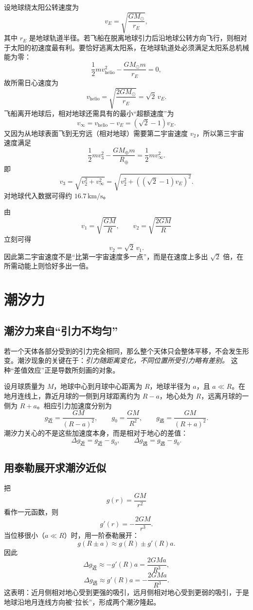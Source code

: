 设地球绕太阳公转速度为
\[
v_E=\sqrt{\frac{GM_\odot}{r_E}},
\]
其中 $r_E$ 是地球轨道半径。若飞船在脱离地球引力后沿地球公转方向飞行，则相对于太阳的初速度最有利。要恰好逃离太阳系，在地球轨道处必须满足太阳系总机械能为零：
\[
\frac12 m v_{\text{helio}}^2-\frac{GM_\odot m}{r_E}=0,
\]
故所需日心速度为
\[
v_{\text{helio}}=\sqrt{\frac{2GM_\odot}{r_E}}=\sqrt{2}\,v_E.
\]
飞船离开地球后，相对地球还需具有的最小“超额速度”为
\[
v_\infty=v_{\text{helio}}-v_E=(\sqrt{2}-1)v_E.
\]
又因为从地球表面飞到无穷远（相对地球）需要第二宇宙速度 $v_2$，所以第三宇宙速度满足
\[
\frac12 mv_3^2-\frac{GM_\oplus m}{R_\oplus}=\frac12 m v_\infty^2.
\]
即
\[
v_3=\sqrt{v_2^2+v_\infty^2}=\sqrt{v_2^2+\left((\sqrt2-1)v_E\right)^2}.
\]
对地球代入数据可得约 $16.7\,\text{km/s}$。

\begin{remark}
由
\[
v_1=\sqrt{\frac{GM}{R}},\qquad v_2=\sqrt{\frac{2GM}{R}}
\]
立刻可得
\[
v_2=\sqrt2\,v_1.
\]
因此第二宇宙速度不是“比第一宇宙速度多一点”，而是在速度上多出 $\sqrt2$ 倍，在所需动能上则恰好多出一倍。
\end{remark}

\section{潮汐力}

\subsection{潮汐力来自“引力不均匀”}

若一个天体各部分受到的引力完全相同，那么整个天体只会整体平移，不会发生形变。潮汐现象的关键在于：\emph{引力随距离变化，不同位置所受引力略有差别。} 这种“差值效应”正是导数所刻画的对象。

设月球质量为 $M$，地球中心到月球中心距离为 $R$，地球半径为 $a$，且 $a\ll R$。在地月连线上，靠近月球的一侧到月球距离约为 $R-a$，地心处为 $R$，远离月球的一侧为 $R+a$。相应引力加速度分别为
\[
g_{\text{近}}=\frac{GM}{(R-a)^2},\qquad g_0=\frac{GM}{R^2},\qquad g_{\text{远}}=\frac{GM}{(R+a)^2}.
\]
潮汐力关心的不是这些加速度本身，而是相对于地心的差值：
\[
\Delta g_{\text{近}}=g_{\text{近}}-g_0,\qquad \Delta g_{\text{远}}=g_{\text{远}}-g_0.
\]

\subsection{用泰勒展开求潮汐近似}

把
\[
g(r)=\frac{GM}{r^2}
\]
看作一元函数，则
\[
g'(r)=-\frac{2GM}{r^3}.
\]
当位移很小（$a\ll R$）时，用一阶泰勒展开：
\[
g(R\pm a)\approx g(R)\pm g'(R)a.
\]
因此
\[
\Delta g_{\text{近}}\approx -g'(R)a=\frac{2GMa}{R^3},
\]
\[
\Delta g_{\text{远}}\approx g'(R)a=-\frac{2GMa}{R^3}.
\]
这表明：近月侧相对地心受到更强的吸引，远月侧相对地心受到更弱的吸引，于是地球沿地月连线方向被“拉长”，形成两个潮汐隆起。

